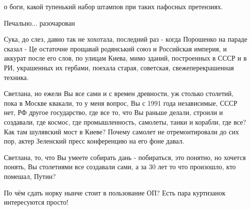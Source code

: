 \begin{itemize}
 
о боги, какой тупенький набор штампов при таких пафосных претензиях.

 
Печально... разочарован

 

Сука, до слез, давно так не хохотала, последний раз - когда Порошенко на параде
сказал - Це остаточне прощавай родянський союз и Российская империя, и аккурат
после его слов, по улицам Киева, мимо зданий, построенных в СССР и в РИ,
украшенных их гербами, поехала старая, советская, свежеперекрашенная техника.

Светлана, но ежели Вы все сами и с времен древности, уж столько столетий, пока
в Москве квакали, то у меня вопрос, Вы с 1991 года независимые, СССР нет, РФ
другое государство, где все то, что Вы раньше делали, строили и создавали, где
космос, где промышленность, самолеты, танки и корабли, где все? Как там
шулявский мост в Киеве? Почему самолет не отремонтировали до сих пор, актер
Зеленский пресс конференцию на его фоне давал. 

Светлана, то, что Вы умеете собирать дань - побираться, это понятно, но хочется
понять, Вы столетиями все создавали сами, а за 30 лет то что произошло, кто
помешал, Путин?

 
По чём сдать норку нынче стоит в пользование ОП? Есть пара куртизанок интересуются просто!

 

\end{itemize}
